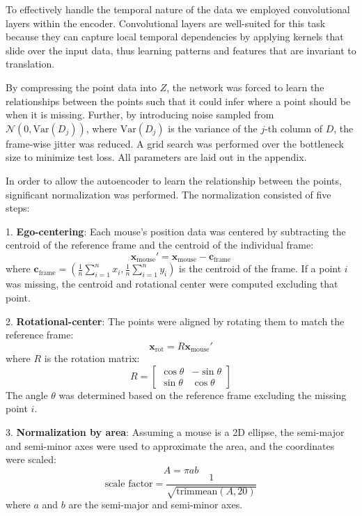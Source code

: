 \documentclass[12pt,english]{article}
\begin{document}
To effectively handle the temporal nature of the data we employed convolutional layers within the encoder. Convolutional layers are well-suited for this task because they can capture local temporal dependencies by applying kernels that slide over the input data, thus learning patterns and features that are invariant to translation.

By compressing the point data into \( Z \), the network was forced to learn the relationships between the points such that it could infer where a point should be when it is missing. Further, by introducing noise sampled from \( \mathcal{N}(0, \text{Var}(D_j)) \), where \( \text{Var}(D_j) \) is the variance of the \( j \)-th column of \( D \), the frame-wise jitter was reduced. A grid search was performed over the bottleneck size to minimize test loss. All parameters are laid out in the appendix.

In order to allow the autoencoder to learn the relationship between the points, significant normalization was performed. The normalization consisted of five steps:

1. \textbf{Ego-centering}: Each mouse's position data was centered by subtracting the centroid of the reference frame and the centroid of the individual frame:
   \[
   \mathbf{x}_{\text{mouse}}' = \mathbf{x}_{\text{mouse}} - \mathbf{c}_{\text{frame}}
   \]
   where \(\mathbf{c}_{\text{frame}} = \left(\frac{1}{n}\sum_{i=1}^n x_i, \frac{1}{n}\sum_{i=1}^n y_i\right)\) is the centroid of the frame. If a point \(i\) was missing, the centroid and rotational center were computed excluding that point.

2. \textbf{Rotational-center}: The points were aligned by rotating them to match the reference frame:
   \[
   \mathbf{x}_{\text{rot}} = R \mathbf{x}_{\text{mouse}}'
   \]
   where \(R\) is the rotation matrix:
   \[
   R = \begin{bmatrix}
   \cos\theta & -\sin\theta \\
   \sin\theta & \cos\theta
   \end{bmatrix}
   \]
   The angle \(\theta\) was determined based on the reference frame excluding the missing point \(i\).

3. \textbf{Normalization by area}: Assuming a mouse is a 2D ellipse, the semi-major and semi-minor axes were used to approximate the area, and the coordinates were scaled:
   \[
   A = \pi a b
   \]
   \[
   \text{scale factor} = \frac{1}{\sqrt{\text{trimmean}(A, 20)}}
   \]
   where \(a\) and \(b\) are the semi-major and semi-minor axes.
\end{document}
